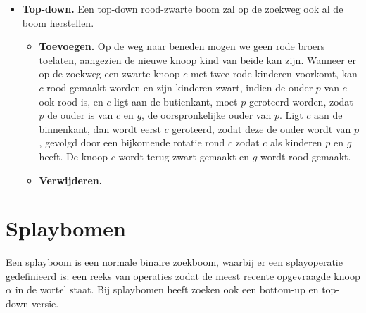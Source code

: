 \documentclass{report}
\begin{document}
\begin{itemize}
		\item \textbf{Top-down.}
			Een top-down rood-zwarte boom zal op de zoekweg ook al de boom herstellen.
			\begin{itemize}
				\item \textbf{Toevoegen.} Op de weg naar beneden mogen we geen rode broers toelaten, aangezien de nieuwe knoop kind van beide kan zijn. Wanneer er op de zoekweg een zwarte knoop $c$ met twee rode kinderen voorkomt, kan $c$ rood gemaakt worden en zijn kinderen zwart, indien de ouder $p$ van $c$ ook rood is, en $c$ ligt aan de butienkant, moet $p$ geroteerd worden, zodat $p$ de ouder is van $c$ en $g$, de oorspronkelijke ouder van $p$. Ligt $c$ aan de binnenkant, dan wordt eerst $c$ geroteerd, zodat deze de ouder wordt van $p$, gevolgd door een bijkomende rotatie rond $c$ zodat $c$ als kinderen $p$ en $g$ heeft. De knoop $c$ wordt terug zwart gemaakt en $g$ wordt rood gemaakt. 
				\item \textbf{Verwijderen.}
			\end{itemize}
	\end{itemize}

	\section{Splaybomen}
	Een splayboom is een normale binaire zoekboom, waarbij er een splayoperatie gedefinieerd is: een reeks van operaties zodat de meest recente opgevraagde knoop $\alpha$ in de wortel staat. Bij splaybomen heeft zoeken ook een bottom-up en top-down versie.
\end{document}
